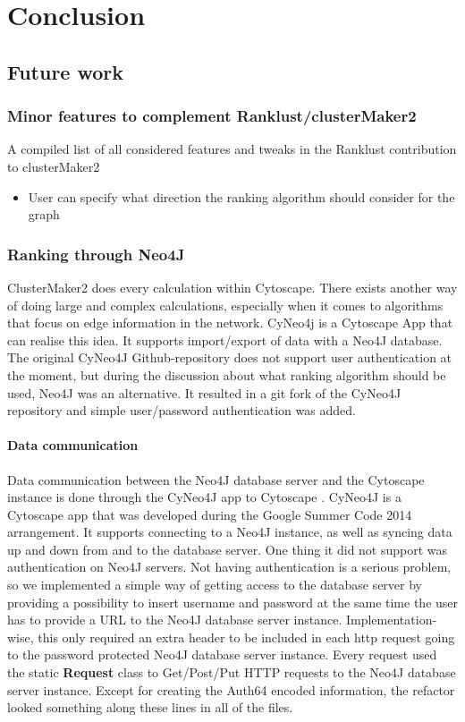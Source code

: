 \chapter{Conclusion}
\section{Future work}
\subsection{Minor features to complement Ranklust/clusterMaker2}
A compiled list of all considered features and tweaks in the Ranklust
contribution to clusterMaker2

\begin{itemize}
    \item User can specify what direction the ranking algorithm should consider
        for the graph
\end{itemize}

\subsection{Ranking through Neo4J}
ClusterMaker2 does every calculation within Cytoscape. There exists another way
of doing large and complex calculations, especially when it comes to algorithms
that focus on edge information in the network. CyNeo4j\cite{cyneo4j} is
a Cytoscape App that can realise this idea. It supports import/export of data
with a Neo4J\cite{neo4j} database. The original CyNeo4J Github-repository does
not support user authentication at the moment, but during the discussion about
what ranking algorithm should be used, Neo4J was an alternative. It resulted in
a git fork\cite{git-fork} of the CyNeo4J repository and simple user/password
authentication was added.

\subsubsection{Data communication}
Data communication between the Neo4J database server and the Cytoscape instance
is done through the CyNeo4J app to Cytoscape \cite{cyneo4j}. CyNeo4J is a
Cytoscape app that was developed during the Google Summer Code 2014 arrangement.
It supports connecting to a Neo4J instance, as well as syncing data up and down
from and to the database server. One thing it did not support was authentication
on Neo4J servers. Not having authentication is a serious problem, so we
implemented a simple way of getting access to the database server by providing a
possibility to insert username and password at the same time the user has to
provide a URL to the Neo4J database server instance. Implementation-wise, this
only required an extra header to be included in each http request going to the
password protected Neo4J database server instance. Every request used the static
\textbf{Request} class to Get/Post/Put HTTP requests to the Neo4J database
server instance. Except for creating the Auth64 encoded information, the
refactor looked something along these lines in all of the files.

